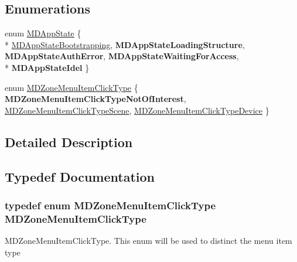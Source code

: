 \subsection*{Enumerations}
\begin{DoxyCompactItemize}
\item 
enum \hyperlink{group___o_s_x_ga20f017e8b56a6fadee4a1a5630628f19}{M\-D\-App\-State} \{ \\*
\hyperlink{group___o_s_x_gga20f017e8b56a6fadee4a1a5630628f19a31225ee52a9d2dedf2995837bbdb1df2}{M\-D\-App\-State\-Bootstrapping}, 
{\bfseries M\-D\-App\-State\-Loading\-Structure}, 
{\bfseries M\-D\-App\-State\-Auth\-Error}, 
{\bfseries M\-D\-App\-State\-Waiting\-For\-Access}, 
\\*
{\bfseries M\-D\-App\-State\-Idel}
 \}
\item 
enum \hyperlink{group___o_s_x_gab0fcddeac9a07ecadc61a58ed26c2a7a}{M\-D\-Zone\-Menu\-Item\-Click\-Type} \{ {\bfseries M\-D\-Zone\-Menu\-Item\-Click\-Type\-Not\-Of\-Interest}, 
\hyperlink{group___o_s_x_ggab0fcddeac9a07ecadc61a58ed26c2a7aa392a69c51cbb02416bee44cecda902b2}{M\-D\-Zone\-Menu\-Item\-Click\-Type\-Scene}, 
\hyperlink{group___o_s_x_ggab0fcddeac9a07ecadc61a58ed26c2a7aa1db07b72af73daafa5ec0c9915d8033b}{M\-D\-Zone\-Menu\-Item\-Click\-Type\-Device}
 \}
\end{DoxyCompactItemize}


\subsection{Detailed Description}


\subsection{Typedef Documentation}
\hypertarget{group___o_s_x_gafcbdee8dea696159e77e84b68842c34d}{
\subsubsection[{M\-D\-Zone\-Menu\-Item\-Click\-Type}]{\setlength{\rightskip}{0pt plus 5cm}typedef enum {\bf M\-D\-Zone\-Menu\-Item\-Click\-Type}  {\bf M\-D\-Zone\-Menu\-Item\-Click\-Type}}}\label{group___o_s_x_gafcbdee8dea696159e77e84b68842c34d}
M\-D\-Zone\-Menu\-Item\-Click\-Type. This enum will be used to distinct the menu item type 

